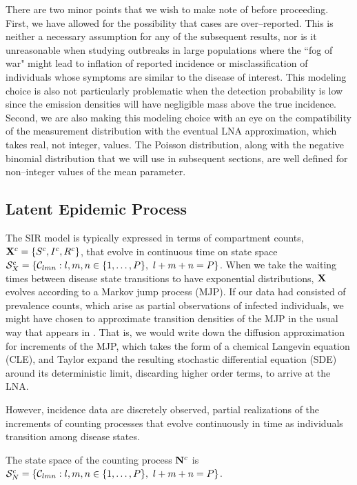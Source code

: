 There are two minor points that we wish to make note of before proceeding. First, we have allowed for the possibility that cases are over--reported. This is neither a necessary assumption for any of the subsequent results, nor is it unreasonable when studying outbreaks in large populations where the ``fog of war" might lead to inflation of reported incidence or misclassification of individuals whose symptoms are similar to the disease of interest. This modeling choice is also not particularly problematic when the detection probability is low since the emission densities will have negligible mass above the true incidence. Second, we are also making this modeling choice with an eye on the compatibility of the measurement distribution with the eventual LNA approximation, which takes real, not integer, values. The Poisson distribution, along with the negative binomial distribution that we will use in subsequent sections, are well defined for non--integer values of the mean parameter. 

\subsection{Latent Epidemic Process}
\label{subsec:lna_epid_proc}

The SIR model is typically expressed in terms of compartment counts, $ \mathbf{X}^c = \lbrace S^c,I^c,R^c\rbrace $, that evolve in continuous time on state space $ \mathcal{S}_X^c = \left \lbrace \mathcal{C}_{lmn}:l,m,n\in\lbrace1,\dots,P\rbrace,\ l+m+n=P\right \rbrace $. When we take the waiting times between disease state transitions to have exponential distributions, $ \mathbf{X} $ evolves according to a Markov jump process (MJP). If our data had consisted of prevalence counts, which arise as partial observations of infected individuals, we might have chosen to approximate transition densities of the MJP in the usual way that appears in \cite{komorowski2009,fearnhead2014}. That is, we would write down the diffusion approximation for increments of the MJP, which takes the form of a chemical Langevin equation (CLE), and Taylor expand the resulting stochastic differential equation (SDE) around its deterministic limit, discarding higher order terms, to arrive at the LNA. 

However, incidence data are discretely observed, partial realizations of the increments of counting processes that evolve continuously in time as individuals transition among disease states. 

The state space of the counting process $ \mathbf{N}^c $ is $ \mathcal{S}_N^c = \left \lbrace \mathcal{C}_{lmn}:l,m,n\in\lbrace1,\dots,P\rbrace,\ l+m+n=P\right \rbrace $. 


